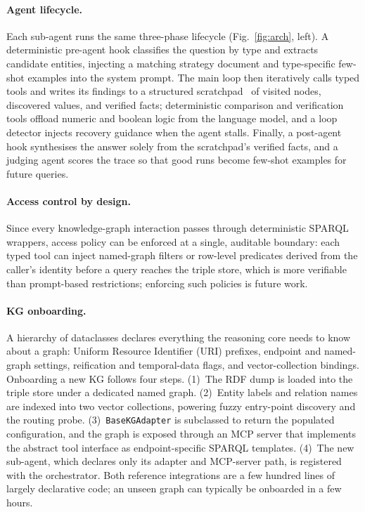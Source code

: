 \documentclass[sigconf,natbib=true]{ceurart}
\begin{document}
\paragraph{Agent lifecycle.}
Each sub-agent runs the same three-phase lifecycle
(Fig.~\ref{fig:arch}, left). A deterministic pre-agent hook classifies
the question by type and extracts candidate entities, injecting a
matching strategy document and type-specific few-shot examples into
the system prompt. The main loop then iteratively calls typed tools
and writes its findings to a structured
scratchpad~\cite{nye2021scratchpad} of visited nodes, discovered
values, and verified facts; deterministic comparison and
verification tools offload numeric and boolean logic from the language
model, and a loop detector injects recovery guidance when the agent
stalls. Finally, a post-agent hook synthesises the answer solely from
the scratchpad's verified facts, and a judging agent scores the trace
so that good runs become few-shot examples for future queries.

\paragraph{Access control by design.}
Since every knowledge-graph interaction passes through deterministic
SPARQL wrappers, access policy can be enforced at a single, auditable
boundary: each typed tool can inject named-graph filters or row-level
predicates derived from the caller's identity before a query reaches
the triple store, which is more verifiable than prompt-based
restrictions; enforcing such policies is future work.

\paragraph{KG onboarding.}
A hierarchy of dataclasses declares everything the reasoning core
needs to know about a graph: Uniform Resource Identifier (URI)
prefixes, endpoint and named-graph
settings, reification and temporal-data flags, and vector-collection
bindings. Onboarding a new KG follows four steps. (1)~The RDF dump is
loaded into the triple store under a dedicated named graph.
(2)~Entity labels and relation names are indexed into two vector
collections, powering fuzzy entry-point discovery and the routing
probe. (3)~\texttt{BaseKGAdapter} is subclassed to return the
populated configuration, and the graph is exposed through an MCP
server that implements the abstract tool interface as
endpoint-specific SPARQL templates. (4)~The new sub-agent, which
declares only its adapter and MCP-server path, is registered with the
orchestrator. Both reference integrations are a few hundred lines of
largely declarative code; an unseen graph can typically be onboarded
in a few hours.
\end{document}
